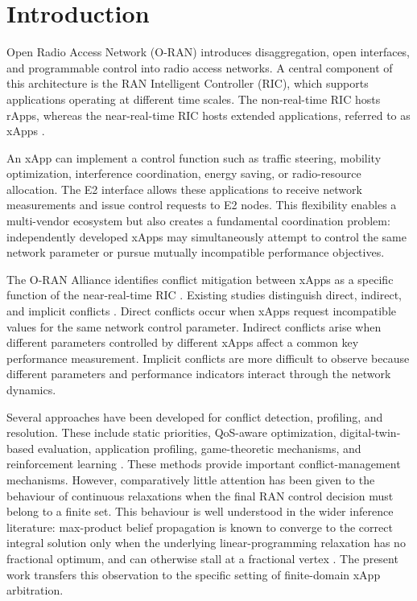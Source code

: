 \documentclass[pdflatex,sn-mathphys-num,iicol,oneside]{sn-jnl}
\begin{document}
\maketitle

\section{Introduction}

Open Radio Access Network (O-RAN) introduces disaggregation,
open interfaces, and programmable control into radio access
networks. A central component of this architecture is the RAN
Intelligent Controller (RIC), which supports applications operating
at different time scales. The non-real-time RIC hosts rApps, whereas
the near-real-time RIC hosts extended applications, referred to as
xApps \cite{polese2023oran}.

An xApp can implement a control function such as traffic steering,
mobility optimization, interference coordination, energy saving, or
radio-resource allocation. The E2 interface allows these applications
to receive network measurements and issue control requests to E2
nodes. This flexibility enables a multi-vendor ecosystem but also
creates a fundamental coordination problem: independently developed
xApps may simultaneously attempt to control the same network
parameter or pursue mutually incompatible performance objectives.

The O-RAN Alliance identifies conflict mitigation between xApps as a
specific function of the near-real-time RIC
\cite{oran2024conflict}. Existing studies distinguish direct,
indirect, and implicit conflicts
\cite{adamczyk2023conflict,wadud2024qacm}.
Direct conflicts occur when xApps request incompatible values for the
same network control parameter. Indirect conflicts arise when
different parameters controlled by different xApps affect a common
key performance measurement. Implicit conflicts are more difficult
to observe because different parameters and performance indicators
interact through the network dynamics.

Several approaches have been developed for conflict detection,
profiling, and resolution. These include static priorities,
QoS-aware optimization, digital-twin-based evaluation, application
profiling, game-theoretic mechanisms, and reinforcement learning
\cite{wadud2024qacm,prever2025pacifista,
giannopoulos2025comix,wadud2025mobility}.
These methods provide important conflict-management mechanisms.
However, comparatively little attention has been given to the
behaviour of continuous relaxations when the final RAN control
decision must belong to a finite set. This behaviour is well
understood in the wider inference literature: max-product belief
propagation is known to converge to the correct integral solution
only when the underlying linear-programming relaxation has no
fractional optimum, and can otherwise stall at a fractional vertex
\cite{park2015maxproduct,bayati2011bmatching}. The present work
transfers this observation to the specific setting of finite-domain
xApp arbitration.
\end{document}
